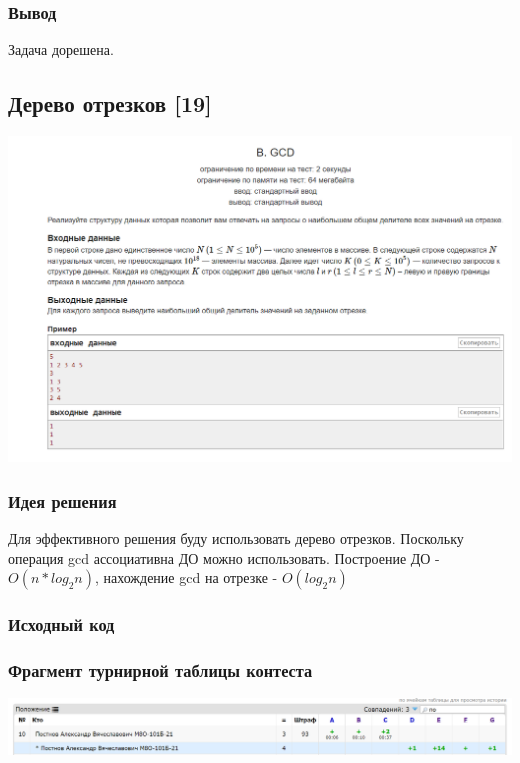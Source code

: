 \subsubsection*{Вывод}
Задача дорешена.

\vspace{20pt}

\pagebreak

\subsection*{Дерево отрезков [19]}
\begin{center}
\includegraphics[width=\textwidth]{statements/21.png}
\end{center}
\subsubsection*{Идея решения}
Для эффективного решения буду использовать дерево отрезков. Поскольку операция gcd ассоциативна ДО можно использовать. Построение ДО - $O(n*log_{2} n)$, нахождение gcd на отрезке - $O(log_{2} n)$
\subsubsection*{Исходный код}


\subsubsection*{Фрагмент турнирной таблицы контеста}
\begin{center}
\includegraphics[width=\textwidth]{standings/21.png}\newline\noindent
\end{center}

